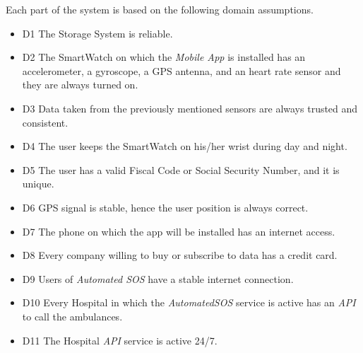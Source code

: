Each part of the system is based on the following domain assumptions.
\begin{itemize}

    \item  D1  The Storage System is reliable.
    
    \item  D2  The SmartWatch on which the \textit{Mobile App} is installed has an accelerometer, a gyroscope, a GPS antenna, and an heart rate sensor and they are always turned on.
    
    \item  D3  Data taken from the previously mentioned sensors are always trusted and consistent.
            
    \item  D4  The user keeps the SmartWatch on his/her wrist during day and night.
    
    \item  D5  The user has a valid Fiscal Code or Social Security Number, and it is unique.
             
    \item  D6  GPS signal is stable, hence the user position is always correct.

    \item  D7  The phone on which the app will be installed has an internet access.

    \item  D8  Every company willing to buy or subscribe to data has a credit card.

    \item  D9  Users of \textit{Automated SOS} have a stable internet connection.
    
    \item  D10  Every Hospital in which the \textit{AutomatedSOS} service is active has an \textit{API} to call the ambulances.
    
    \item  D11  The Hospital \textit{API} service is active 24/7.
    
\end{itemize}
